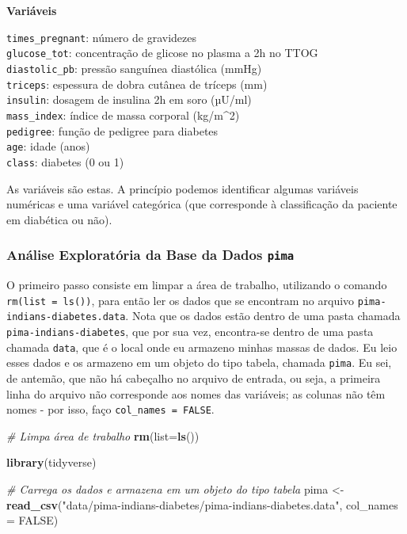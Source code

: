 \documentclass[
]{book}
\newenvironment{Shaded}{\begin{snugshade}}{\end{snugshade}}
\newcommand{\CommentTok}[1]{\textcolor[rgb]{0.56,0.35,0.01}{\textit{#1}}}
\newcommand{\DataTypeTok}[1]{\textcolor[rgb]{0.13,0.29,0.53}{#1}}
\newcommand{\KeywordTok}[1]{\textcolor[rgb]{0.13,0.29,0.53}{\textbf{#1}}}
\newcommand{\NormalTok}[1]{#1}
\newcommand{\OtherTok}[1]{\textcolor[rgb]{0.56,0.35,0.01}{#1}}
\newcommand{\StringTok}[1]{\textcolor[rgb]{0.31,0.60,0.02}{#1}}
\theoremstyle{definition}
\theoremstyle{definition}
\theoremstyle{definition}
\theoremstyle{remark}
\begin{document}
\textbf{Variáveis}

\texttt{times\_pregnant}: número de gravidezes\\
\texttt{glucose\_tot}: concentração de glicose no plasma a 2h no TTOG\\
\texttt{diastolic\_pb}: pressão sanguínea diastólica (mmHg)\\
\texttt{triceps}: espessura de dobra cutânea de tríceps (mm)\\
\texttt{insulin}: dosagem de insulina 2h em soro (µU/ml)\\
\texttt{mass\_index}: índice de massa corporal (kg/m\^{}2)\\
\texttt{pedigree}: função de pedigree para diabetes\\
\texttt{age}: idade (anos)\\
\texttt{class}: diabetes (0 ou 1)

As variáveis são estas. A princípio podemos identificar algumas variáveis numéricas e uma variável categórica (que corresponde à classificação da paciente em diabética ou não).

\hypertarget{anuxe1lise-exploratuxf3ria-da-base-da-dados-pima}{%
\subsubsection*{\texorpdfstring{Análise Exploratória da Base da Dados \texttt{pima}}{Análise Exploratória da Base da Dados pima}}\label{anuxe1lise-exploratuxf3ria-da-base-da-dados-pima}}

O primeiro passo consiste em limpar a área de trabalho, utilizando o comando \texttt{rm(list\ =\ ls())}, para então ler os dados que se encontram no arquivo \texttt{pima-indians-diabetes.data}. Nota que os dados estão dentro de uma pasta chamada \texttt{pima-indians-diabetes}, que por sua vez, encontra-se dentro de uma pasta chamada \texttt{data}, que é o local onde eu armazeno minhas massas de dados.
Eu leio esses dados e os armazeno em um objeto do tipo tabela, chamada \texttt{pima}. Eu sei, de antemão, que não há cabeçalho no arquivo de entrada, ou seja, a primeira linha do arquivo não corresponde aos nomes das variáveis; as colunas não têm nomes - por isso, faço \texttt{col\_names\ =\ FALSE}.

\begin{Shaded}
\begin{Highlighting}[]
\CommentTok{# Limpa área de trabalho}
\KeywordTok{rm}\NormalTok{(}\DataTypeTok{list=}\KeywordTok{ls}\NormalTok{())}

\KeywordTok{library}\NormalTok{(tidyverse)}

\CommentTok{# Carrega os dados e armazena em um objeto do tipo tabela}
\NormalTok{pima <-}\StringTok{ }\KeywordTok{read_csv}\NormalTok{(}\StringTok{"data/pima-indians-diabetes/pima-indians-diabetes.data"}\NormalTok{, }
                 \DataTypeTok{col_names =} \OtherTok{FALSE}\NormalTok{)}
\end{Highlighting}
\end{Shaded}
\end{document}
